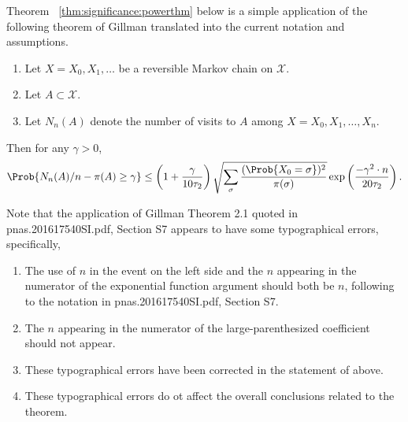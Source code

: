 \documentclass[12pt]{article}
\begin{document}
Theorem~%
\ref{thm:significance:powerthm} below is a simple application of the
following theorem of Gillman
\cite[Theorem 2.1]{gillman98} translated into the current notation and
assumptions.

\begin{theorem}
    \label{thm:significance:gillman}
    \begin{enumerate}
        \item
            Let \( X = X_0, X_1, \dots \) be a reversible Markov chain
            on \( \mathcal{X} \).
        \item
            Let \( A \subset \mathcal{X} \).
        \item
            Let \( N_n(A) \) denote the number of visits to \( A \)
            among \( X = X_0, X_1, \dots, X_n \).
    \end{enumerate}
    Then for any \( \gamma > 0 \),
    \[
        \Prob{N_n(A)/n - \pi(A) \ge \gamma} \le \left( 1 + \frac{\gamma}
        {10 \tau_2} \right) \sqrt{\sum_{\sigma} \frac{(\Prob{X_0 =
        \sigma})^2}{\pi (\sigma)}} \exp \left( \frac{-\gamma^2 \cdot n}{20
        \tau_2} \right).
    \]
\end{theorem}

\begin{remark}
  Note that the application of Gillman Theorem 2.1 quoted in
  pnas.201617540SI.pdf, Section S7 appears to have some typographical
  errors, specifically,
  \begin{enumerate}
  \item The use of \( n \) in the event on the left side and the \( n
    \) appearing in the numerator of the exponential function argument
    should both be \( n \), following to the notation in
    pnas.201617540SI.pdf, Section S7.
  \item The \( n \) appearing in the numerator of the
    large-parenthesized coefficient should not appear.
  \item These typographical errors have been corrected in the
    statement of above.
  \item These typographical errors do ot affect the overall
    conclusions related to the theorem.
  \end{enumerate}
\end{remark}
\end{document}
